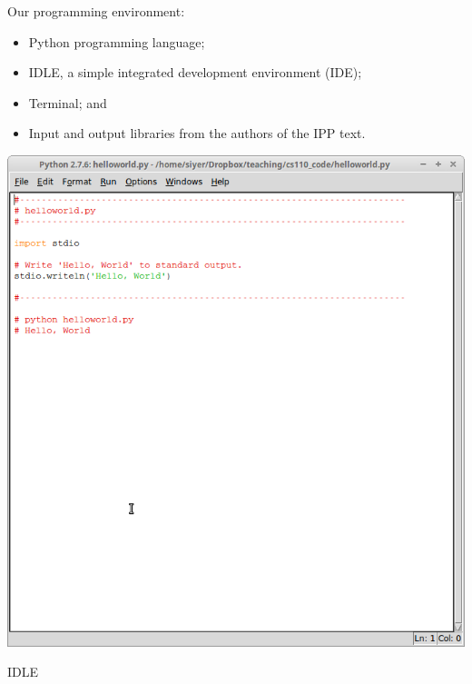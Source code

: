 \documentclass[8pt,a4paper,compress,handout]{beamer}
\begin{document}
\begin{frame}[fragile]
\begin{minipage}{200pt}
Our programming environment:
\begin{itemize}
\item Python programming language;  
\item IDLE, a simple integrated development environment (IDE);
\item Terminal; and
\item Input and output libraries from the authors of the IPP text. \end{itemize}
\end{minipage}%
\begin{minipage}{100pt}
\begin{center}
\includegraphics[scale=0.16]{figures/idle.png}

\smallskip

\tiny IDLE

\smallskip


\end{center}
\end{minipage}
\end{frame}
\end{document}
